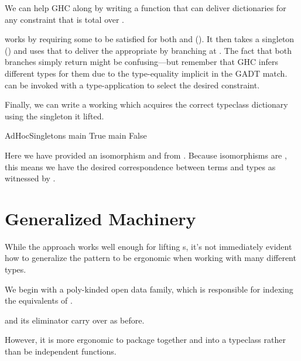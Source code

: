 \documentclass[book.tex]{subfiles}
\begin{document}
We can help GHC along by writing a function that can deliver dictionaries for
any constraint that is total over .


 works by requiring some  to be satisfied for
both  and  (). It then takes a singleton ()
and uses that to deliver the appropriate  by branching at
. The fact that both branches simply return  might be
confusing---but remember that GHC infers different types for them due to the
type-equality implicit in the GADT match.  can be invoked with a
 type-application to select the desired constraint.

Finally, we can write a working  which acquires the correct typeclass
dictionary using the singleton it lifted.


\begin{dorepl}{AdHocSingletons}
main True
main False
\end{dorepl}

Here we have provided an isomorphism  and from . Because isomorphisms are , this
means we have the desired correspondence between terms and types as witnessed by
.


\section{Generalized Machinery}


While the  approach works well enough for lifting s, it's not
immediately evident how to generalize the pattern to be ergonomic when working
with many different types.

We begin with a poly-kinded open data family, which is responsible for indexing
the equivalents of .


 and its eliminator carry over as before.


However, it is more ergonomic to package together  and 
into a typeclass rather than be independent functions.
\end{document}
